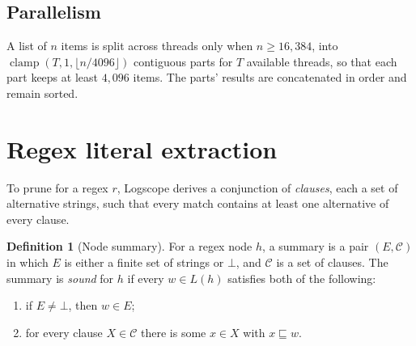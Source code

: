 \documentclass[11pt]{article}
\theoremstyle{plain}
\theoremstyle{definition}
\newtheorem{definition}[theorem]{Definition}
\theoremstyle{remark}
\newcommand{\sub}{\sqsubseteq}
\begin{document}
\subsection{Parallelism}

A list of $n$ items is split across threads only when $n \ge 16{,}384$, into
$\operatorname{clamp}(T, 1, \lfloor n / 4096 \rfloor)$ contiguous parts for $T$
available threads, so that each part keeps at least $4{,}096$ items. The parts'
results are concatenated in order and remain sorted.

\section{Regex literal extraction}\label{sec:regex}

To prune for a regex $r$, Logscope derives a conjunction of \emph{clauses}, each
a set of alternative strings, such that every match contains at least one
alternative of every clause.

\begin{definition}[Node summary]\label{def:summary}
For a regex node $h$, a summary is a pair $(E, \mathcal{C})$ in which $E$ is
either a finite set of strings or $\bot$, and $\mathcal{C}$ is a set of clauses.
The summary is \emph{sound} for $h$ if every $w \in L(h)$ satisfies both of the
following:
\begin{enumerate}
  \item if $E \ne \bot$, then $w \in E$;
  \item for every clause $X \in \mathcal{C}$ there is some $x \in X$ with $x \sub w$.
\end{enumerate}
\end{definition}
\end{document}
